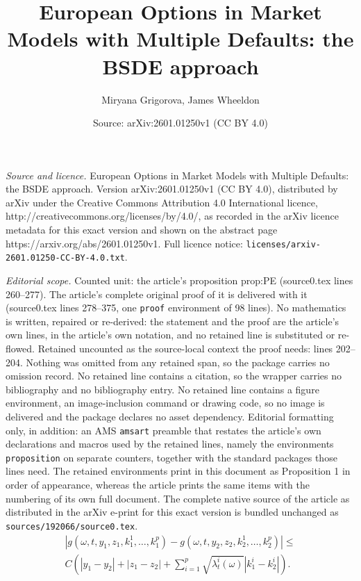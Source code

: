 \documentclass[10pt,a4paper]{amsart}
\title{European Options in Market Models with Multiple Defaults: the BSDE approach}
\author{Miryana Grigorova, James Wheeldon}
\date{Source: arXiv:2601.01250v1 (CC BY 4.0)}
\begin{document}
\maketitle

\noindent\emph{Source and licence.} European Options in Market Models with Multiple Defaults: the BSDE approach. Version arXiv:2601.01250v1 (CC BY 4.0), distributed by arXiv under the Creative Commons Attribution 4.0 International licence, http://creativecommons.org/licenses/by/4.0/, as recorded in the arXiv licence metadata for this exact version and shown on the abstract page https://arxiv.org/abs/2601.01250v1. Full licence notice: \texttt{licenses/arxiv-2601.01250-CC-BY-4.0.txt}.\par\smallskip

\noindent\textit{Editorial scope.} Counted unit: the article's proposition prop:PE (source0.tex lines 260--277). The article's complete original proof of it is delivered with it (source0.tex lines 278--375, one \texttt{proof} environment of 98 lines). No mathematics is written, repaired or re-derived: the statement and the proof are the article's own lines, in the article's own notation, and no retained line is substituted or re-flowed.  Retained uncounted as the source-local context the proof needs: lines 202--204.  Nothing was omitted from any retained span, so the package carries no omission record.  No retained line contains a citation, so the wrapper carries no bibliography and no bibliography entry.  No retained line contains a figure environment, an image-inclusion command or drawing code, so no image is delivered and the package declares no asset dependency.  Editorial formatting only, in addition: an AMS \texttt{amsart} preamble that restates the article's own declarations and macros used by the retained lines, namely the environments \texttt{proposition} on separate counters, together with the standard packages those lines need.  The retained environments print in this document as Proposition 1 in order of appearance, whereas the article prints the same items with the numbering of its own full document.  The complete native source of the article as distributed in the arXiv e-print for this exact version is bundled unchanged as \texttt{sources/192066/source0.tex}.
    \begin{multline}\label{eq:2-LAD}
        |g(\omega, t, y_1,z_1,k_1^1,\ldots,k_1^p) - g(\omega, t, y_2,z_2,k_2^1,\ldots,k_2^p)| \le\\ C\left(|y_1-y_2|+|z_1-z_2| + \sum_{i=1}^p\sqrt{\lambda_t^i(\omega)}|k_1^i-k_2^i|\right).
    \end{multline}
\end{document}

